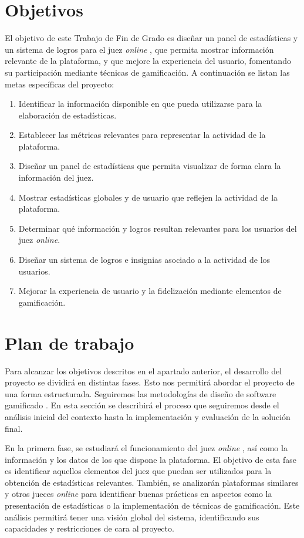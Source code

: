 \section{Objetivos}
El objetivo de este Trabajo de Fin de Grado es diseñar un panel de estadísticas y un sistema de logros para el juez \textit{online} \aer, que permita mostrar información relevante de la plataforma, y que mejore la experiencia del usuario, fomentando su participación mediante técnicas de gamificación. A continuación se listan las metas específicas del proyecto:
\begin{enumerate}
    \item Identificar la información disponible en \aer que pueda utilizarse para la elaboración de estadísticas.
    \item Establecer las métricas relevantes para representar la actividad de la plataforma.
    \item Diseñar un panel de estadísticas que permita visualizar de forma clara la información del juez.
    \item Mostrar estadísticas globales y de usuario que reflejen la actividad de la plataforma.
    \item Determinar qué información y logros resultan relevantes para los usuarios del juez \textit{online}.
    \item Diseñar un sistema de logros e insignias asociado a la actividad de los usuarios.
    \item Mejorar la experiencia de usuario y la fidelización mediante elementos de gamificación.
\end{enumerate}


\section{Plan de trabajo}
Para alcanzar los objetivos descritos en el apartado anterior, el desarrollo del proyecto se dividirá en distintas fases. Esto nos permitirá abordar el proyecto de una forma estructurada. Seguiremos las metodologías de diseño de software gamificado \cite{Morschheuser_Hassan_Werder_Hamari_2018}. En esta sección se describirá el proceso que seguiremos desde el análisis inicial del contexto hasta la implementación y evaluación de la solución final.

En la primera fase, se estudiará el funcionamiento del juez \textit{online} \aer, así como la información y los datos de los que dispone la plataforma. El objetivo de esta fase es identificar aquellos elementos del juez que puedan ser utilizados para la obtención de estadísticas relevantes. También, se analizarán plataformas similares y otros jueces \textit{online} para  identificar buenas prácticas en aspectos como la presentación de estadísticas o la implementación de técnicas de gamificación. Este análisis permitirá tener una visión global del sistema, identificando sus capacidades y restricciones de cara al proyecto.


